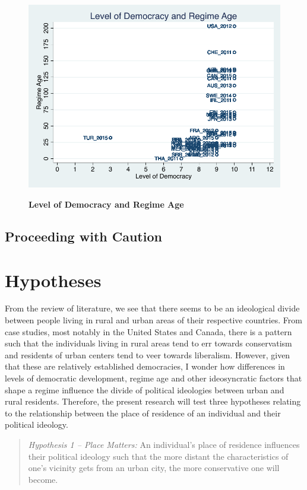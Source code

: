 \documentclass[12pt, titlepage]{article}
\newcommand\e{\emph}
\newcommand\tb{\textbf}
\begin{document}
\begin{figure}[ht!]    \centering
	{	 \includegraphics[width=\textwidth]{DemAge}}
	\caption{\tb{Level of Democracy and Regime Age}}\label{figure2}
\end{figure}

\subsection{Proceeding with Caution}



\section{Hypotheses}

From the review of literature, we see that there seems to be an ideological divide between people living in rural and urban areas of their respective countries. From case studies, most notably in the United States and Canada, there is a pattern such that the individuals living in rural areas tend to err towards conservatism and residents of urban centers tend to veer towards liberalism. However, given that these are relatively established democracies, I wonder how differences in levels of democratic development, regime age and other ideosyncratic factors that shape a regime influence the divide of political ideologies between urban and rural residents. Therefore, the present research will test three hypotheses relating to the relationship between the place of residence of an individual and their political ideology.

\begin{quote}
	\e {Hypothesis 1 -- Place Matters:} An individual's place of residence influences their political ideology such that the more distant the characteristics of one's vicinity gets from an urban city, the more conservative one will become.
\end{quote}
\end{document}
